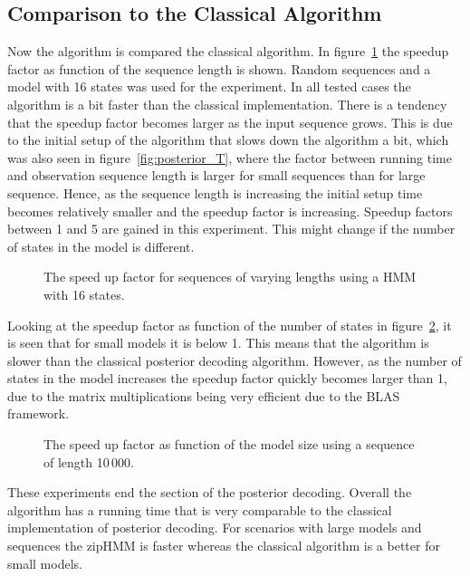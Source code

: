 \subsection{Comparison to the Classical Algorithm}
\label{sec:comp-class-algor}

Now the algorithm is compared the classical algorithm. In
figure~\ref{fig:posterior_speedup_vs_sequence_length} the speedup factor as
function of the sequence length is shown. Random sequences and a model with 16
states was used for the experiment. In all tested cases the algorithm is a bit
faster than the classical implementation. There is a tendency that the speedup
factor becomes larger as the input sequence grows. This is due to the initial
setup of the algorithm that slows down the algorithm a bit, which was also seen
in figure~\ref{fig:posterior_T}, where the factor between running time and
observation sequence length is larger for small sequences than for large
sequence. Hence, as the sequence length is increasing the initial setup time
becomes relatively smaller and the speedup factor is increasing. Speedup
factors between 1 and 5 are gained in this experiment. This might change if the
number of states in the model is different.

\begin{figure}
  \centering
  
  \caption{The speed up factor for sequences of varying lengths using a HMM
    with 16 states.}
  \label{fig:posterior_speedup_vs_sequence_length}
\end{figure}

Looking at the speedup factor as function of the number of states in
figure~\ref{fig:posterior_speedup_vs_N}, it is seen that for small models it is
below 1. This means that the algorithm is slower than the classical posterior
decoding algorithm. However, as the number of states in the model increases the
speedup factor quickly becomes larger than 1, due to the matrix multiplications
being very efficient due to the BLAS framework.

\begin{figure}
  \centering
  
  \caption{The speed up factor as function of the model size using a sequence
    of length 10\,000.}
  \label{fig:posterior_speedup_vs_N}
\end{figure}

These experiments end the section of the posterior decoding. Overall the
algorithm has a running time that is very comparable to the classical
implementation of posterior decoding. For scenarios with large models and
sequences the zipHMM is faster whereas the classical algorithm is a better
for small models.

